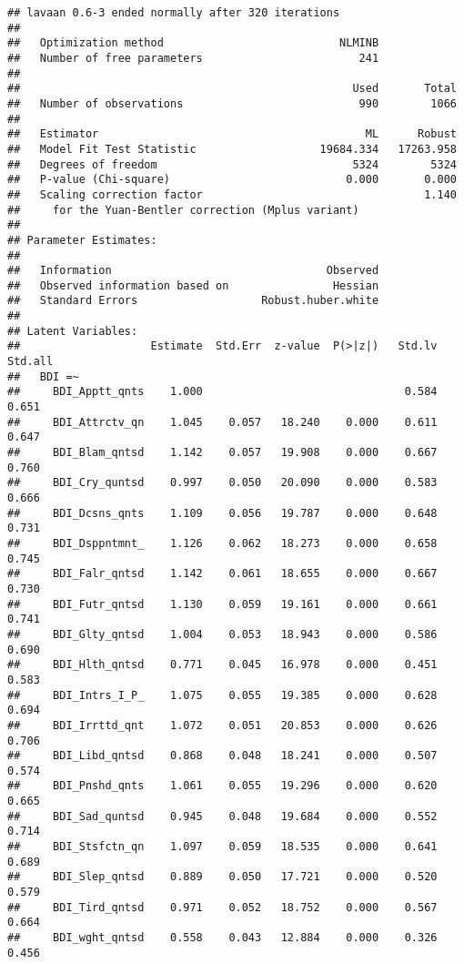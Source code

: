 \documentclass[]{article}
\begin{document}
\begin{verbatim}
## lavaan 0.6-3 ended normally after 320 iterations
## 
##   Optimization method                           NLMINB
##   Number of free parameters                        241
## 
##                                                   Used       Total
##   Number of observations                           990        1066
## 
##   Estimator                                         ML      Robust
##   Model Fit Test Statistic                   19684.334   17263.958
##   Degrees of freedom                              5324        5324
##   P-value (Chi-square)                           0.000       0.000
##   Scaling correction factor                                  1.140
##     for the Yuan-Bentler correction (Mplus variant)
## 
## Parameter Estimates:
## 
##   Information                                 Observed
##   Observed information based on                Hessian
##   Standard Errors                   Robust.huber.white
## 
## Latent Variables:
##                    Estimate  Std.Err  z-value  P(>|z|)   Std.lv  Std.all
##   BDI =~                                                                
##     BDI_Apptt_qnts    1.000                               0.584    0.651
##     BDI_Attrctv_qn    1.045    0.057   18.240    0.000    0.611    0.647
##     BDI_Blam_qntsd    1.142    0.057   19.908    0.000    0.667    0.760
##     BDI_Cry_quntsd    0.997    0.050   20.090    0.000    0.583    0.666
##     BDI_Dcsns_qnts    1.109    0.056   19.787    0.000    0.648    0.731
##     BDI_Dsppntmnt_    1.126    0.062   18.273    0.000    0.658    0.745
##     BDI_Falr_qntsd    1.142    0.061   18.655    0.000    0.667    0.730
##     BDI_Futr_qntsd    1.130    0.059   19.161    0.000    0.661    0.741
##     BDI_Glty_qntsd    1.004    0.053   18.943    0.000    0.586    0.690
##     BDI_Hlth_qntsd    0.771    0.045   16.978    0.000    0.451    0.583
##     BDI_Intrs_I_P_    1.075    0.055   19.385    0.000    0.628    0.694
##     BDI_Irrttd_qnt    1.072    0.051   20.853    0.000    0.626    0.706
##     BDI_Libd_qntsd    0.868    0.048   18.241    0.000    0.507    0.574
##     BDI_Pnshd_qnts    1.061    0.055   19.296    0.000    0.620    0.665
##     BDI_Sad_quntsd    0.945    0.048   19.684    0.000    0.552    0.714
##     BDI_Stsfctn_qn    1.097    0.059   18.535    0.000    0.641    0.689
##     BDI_Slep_qntsd    0.889    0.050   17.721    0.000    0.520    0.579
##     BDI_Tird_qntsd    0.971    0.052   18.752    0.000    0.567    0.664
##     BDI_wght_qntsd    0.558    0.043   12.884    0.000    0.326    0.456

\end{verbatim}
\end{document}

